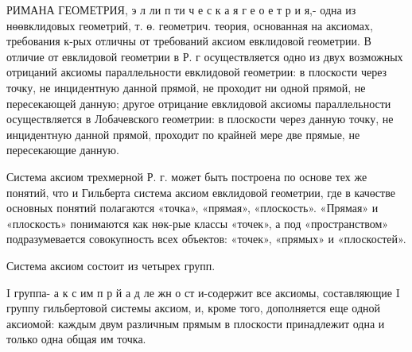 \documentclass[10pt]{article}
\begin{document}
РИМАНА ГЕОМЕТРИЯ, э л ли п ти ч е с к а я г е о е т р и я,- одна из нөөвклидовых геометрий, т. ө. геометрич. теория, основанная на аксиомах, требования к-рых отличны от требований аксиом евклидовой геометрии. В отличие от евклидовой геометрии в Р. г осуществляется одно из двух возможных отрицаний аксиомы параллельности евклидовой геометрии: в плоскости через точку, не инцидентную данной прямой, не проходит ни одной прямой, не пересекающей данную; другое отрицание евклидовой аксиомы параллельности осуществляется в Лобачевского геометрии: в плоскости через данную точку, не инцидентную данной прямой, проходит по крайней мере две прямые, не пересекающие данную.



Система аксиом трехмерной Р. г. может быть построена по основе тех же понятий, что и Гильберта система аксиом евклидовой геометрии, где в качөстве основных понятий полагаются «точка», «прямая», «плоскость». «Прямая» и «плоскость» понимаются как нөк-рые классы «точек», а под «пространством» подразумевается совокупность всех объектов: «точек», «прямых» и «плоскостей».



Система аксиом состоит из четырех групп.



I группа- а к с им п р й а д ле жн о ст и-содержит все аксиомы, составляющие I группу гильбертовой системы аксиом, и, кроме того, дополняется еще одной аксиомой: каждым двум различным прямым в плоскости принадлежит одна и только одна общая им точка.
\end{document}
